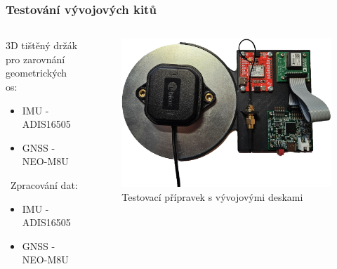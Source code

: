 \documentclass[%
  12pt,       				%
	t,                  %
	aspectratio=1610,   %
	unicode,						%
]{beamer}				    	%
\begin{document}
\begin{frame} 
	\frametitle{Testování vývojových kitů}
	
	\begin{columns}[T] 								%
		\begin{column}{0.3\textwidth}		%
			3D tištěný držák pro zarovnání geometrických os:
			\begin{itemize}
				\item IMU - ADIS16505
				\item GNSS - NEO-M8U
			\end{itemize}
			\
			Zpracování dat:\\[2ex]
			\begin{itemize}
				\item IMU - ADIS16505
				\item GNSS - NEO-M8U
			\end{itemize}
		\end{column}
		\begin{column}{0.7\textwidth}		%
			\begin{figure}%
				\centering
				\includegraphics[width=1\columnwidth]{obrazky/devBoards}
				\caption{Testovací přípravek s vývojovými deskami}%
			\end{figure}
		\end{column}
	\end{columns}						
	
	
			

	
\end{frame} 
\end{document}
